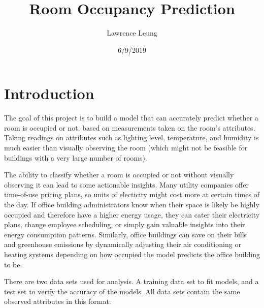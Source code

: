 \documentclass{article}
\title{Room Occupancy Prediction}
\author{Lawrence Leung}
\date{6/9/2019}
\begin{document}
\maketitle

\section{Introduction}
The goal of this project is to build a model that can accurately predict whether a room is occupied or not, based on measurements taken on the room's attributes. Taking readings on attributes such as lighting level, temperature, and humidity is much easier than visually observing the room (which might not be feasible for buildings with a very large number of rooms). 


The ability to classify whether a room is occupied or not without visually observing it can lead to some actionable insights. Many utility companies offer time-of-use pricing plans, so units of electicity might cost more at certain times of the day. If office building administrators know when their space is likely be highly occupied and therefore have a higher energy usage, they can cater their electricity plans, change employee scheduling, or simply gain valuable insights into their energy consumption patterns. Similarly, office buildings can save on their bills and greenhouse emissions by dynamically adjusting their air conditioning or heating systems depending on how occupied the model predicts the office building to be.


There are two data sets used for analysis. A training data set to fit models, and a test set to verify the accuracy of the models. All data sets contain the same observed attributes in this format:
\end{document}
